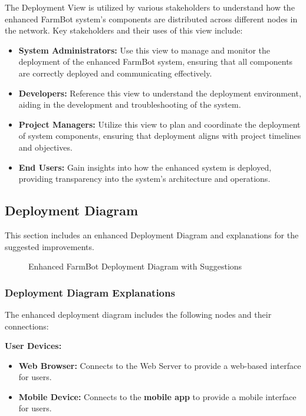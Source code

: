The Deployment View is utilized by various stakeholders to understand how the enhanced FarmBot system's components are distributed across different nodes in the network. Key stakeholders and their uses of this view include:

\begin{itemize}
    \item \textbf{System Administrators:} Use this view to manage and monitor the deployment of the enhanced FarmBot system, ensuring that all components are correctly deployed and communicating effectively.
    \item \textbf{Developers:} Reference this view to understand the deployment environment, aiding in the development and troubleshooting of the system.
    \item \textbf{Project Managers:} Utilize this view to plan and coordinate the deployment of system components, ensuring that deployment aligns with project timelines and objectives.
    \item \textbf{End Users:} Gain insights into how the enhanced system is deployed, providing transparency into the system's architecture and operations.
\end{itemize}

\subsection{Deployment Diagram}

This section includes an enhanced Deployment Diagram and explanations for the suggested improvements.

\begin{figure}[H]
    \centering
    
    \caption{Enhanced FarmBot Deployment Diagram with Suggestions}
\end{figure}

\subsubsection{Deployment Diagram Explanations}

The enhanced deployment diagram includes the following nodes and their connections:

\textbf{User Devices:}
\begin{itemize}
    \item \textbf{Web Browser:} Connects to the Web Server to provide a web-based interface for users.
    \item \textbf{Mobile Device:} Connects to the \textbf{mobile app} to provide a mobile interface for users.
\end{itemize}


